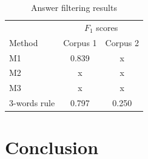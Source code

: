 \documentclass{edm_template}
\begin{document}
\begin{table}
  \caption{Answer filtering results}
  \label{tab:res}
  \begin{center}
    
    \begin{tabular}{lcc}
      \hline
      & \multicolumn{2}{c}{$F_1$ scores}\\
      \cline{2-3}
            {Method} & Corpus 1 & Corpus 2\\
            \hline
            M1 & 0.839 & x \\
            M2 & x & x \\
            M3 & x & x \\
            3-words rule & 0.797 & 0.250 \\
            \hline
    \end{tabular}
  \end{center}
\end{table}



\section{Conclusion}







\end{document}
